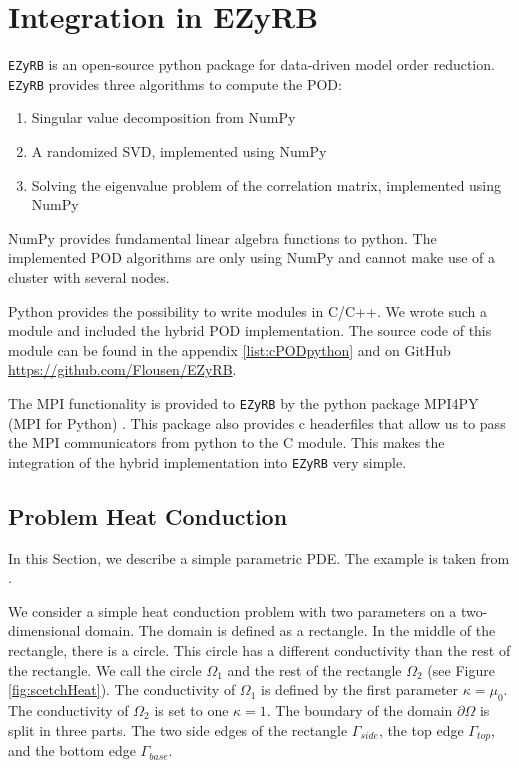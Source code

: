 \newpage
\section{Integration in EZyRB}
\label{sec:integration}
\texttt{EZyRB} is an open-source python package for data-driven model order reduction.
\texttt{EZyRB} provides three algorithms to compute the POD:
\begin{enumerate}
	\item Singular value decomposition from NumPy
	\item A randomized SVD, implemented using NumPy
	\item Solving the eigenvalue problem of the correlation matrix, implemented using NumPy
\end{enumerate}
NumPy provides fundamental linear algebra functions to python.
The implemented POD algorithms are only using NumPy and cannot make use of a cluster with several nodes.

Python provides the possibility to write modules in C/C++. We wrote such a module and included the hybrid POD implementation. The source code of this module can be found in the appendix \ref{list:cPODpython} and on GitHub \url{https://github.com/Flousen/EZyRB}.

The MPI functionality is provided to \texttt{EZyRB} by the
python package MPI4PY (MPI for Python)
\cite{DALCIN20111124}\cite{DALCIN20051108}\cite{DALCIN2008655}.
This package also provides c headerfiles that allow us to pass the MPI communicators from python to the C module.
This makes the integration of the hybrid implementation into \texttt{EZyRB} very simple.







\newpage
\subsection{Problem Heat Conduction}
\label{sec:HeatConduction}
In this Section, we describe a simple parametric PDE. The example is taken from \cite[Section 2.3.1]{HRSbook}.

We consider a simple heat conduction problem with two parameters on a two-dimensional domain.
The domain is defined as a rectangle. In the middle of the rectangle, there is a circle.
This circle has a different conductivity than the rest of the rectangle.
We call the circle $\Omega_1$ and the rest of the rectangle $\Omega_2$ (see Figure \ref{fig:scetchHeat}).
The conductivity of $\Omega_1$ is defined by the first parameter $\kappa = \mu_{0}$.
The conductivity of $\Omega_2$ is set to one $\kappa = 1$.
The boundary of the domain $\partial \Omega$ is split in three parts.
The two side edges of the rectangle $\Gamma_{side}$, the top edge $\Gamma_{top}$, and the bottom edge $\Gamma_{base}$.

